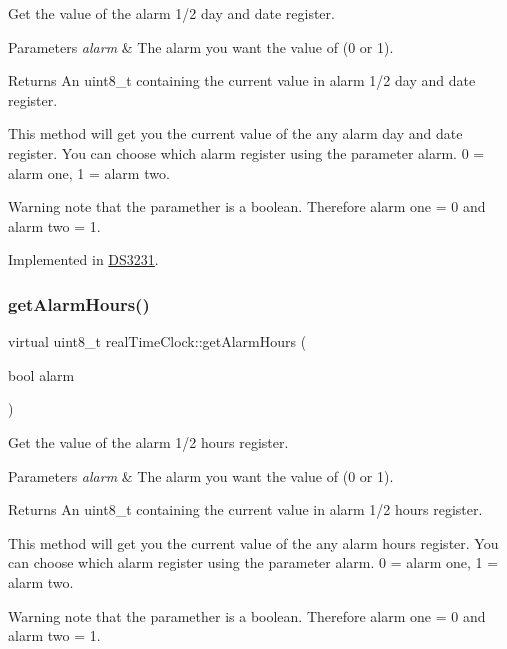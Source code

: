 Get the value of the alarm 1/2 day and date register. 


\begin{DoxyParams}{Parameters}
{\em alarm} & The alarm you want the value of (0 or 1). \\
\hline
\end{DoxyParams}
\begin{DoxyReturn}{Returns}
An uint8\+\_\+t containing the current value in alarm 1/2 day and date register.
\end{DoxyReturn}
This method will get you the current value of the any alarm day and date register. You can choose which alarm register using the parameter alarm. 0 = alarm one, 1 = alarm two. \begin{DoxyWarning}{Warning}
note that the paramether is a boolean. Therefore alarm one = 0 and alarm two = 1. 
\end{DoxyWarning}


Implemented in \mbox{\hyperlink{class_d_s3231_a0b013c68f96b5145c1c9feb9270855a7}{D\+S3231}}.

\mbox{\label{classreal_time_clock_abca1ab557b357e3046d7d97eec89f750}} 
\subsubsection{\texorpdfstring{get\+Alarm\+Hours()}{getAlarmHours()}}
{\footnotesize\ttfamily virtual uint8\+\_\+t real\+Time\+Clock\+::get\+Alarm\+Hours (\begin{DoxyParamCaption}\item[{bool}]{alarm }\end{DoxyParamCaption})\hspace{0.3cm}{\ttfamily [pure virtual]}}



Get the value of the alarm 1/2 hours register. 


\begin{DoxyParams}{Parameters}
{\em alarm} & The alarm you want the value of (0 or 1). \\
\hline
\end{DoxyParams}
\begin{DoxyReturn}{Returns}
An uint8\+\_\+t containing the current value in alarm 1/2 hours register.
\end{DoxyReturn}
This method will get you the current value of the any alarm hours register. You can choose which alarm register using the parameter alarm. 0 = alarm one, 1 = alarm two. \begin{DoxyWarning}{Warning}
note that the paramether is a boolean. Therefore alarm one = 0 and alarm two = 1. 
\end{DoxyWarning}


